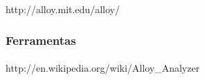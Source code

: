 http://alloy.mit.edu/alloy/
\subsubsection{Ferramentas}
\paragraph{}
http://en.wikipedia.org/wiki/Alloy\_Analyzer
